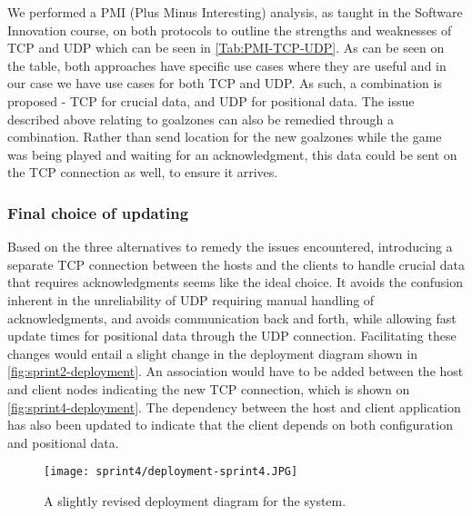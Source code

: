 We performed a PMI (Plus Minus Interesting) analysis, as taught in the Software Innovation course, on both protocols to outline the strengths and weaknesses of TCP and UDP which can be seen in \autoref{Tab:PMI-TCP-UDP}.
As can be seen on the table, both approaches have specific use cases where they are useful and in our case we have use cases for both TCP and UDP.
As such, a combination is proposed - TCP for crucial data, and UDP for positional data.
The issue described above relating to goalzones can also be remedied through a combination.
Rather than send location for the new goalzones while the game was being played and waiting for an acknowledgment, this data could be sent on the TCP connection as well, to ensure it arrives.

\subsubsection{Final choice of updating}
Based on the three alternatives to remedy the issues encountered, introducing a separate TCP connection between the hosts and the clients to handle crucial data that requires acknowledgments seems like the ideal choice.
It avoids the confusion inherent in the unreliability of UDP requiring manual handling of acknowledgments, and avoids communication back and forth, while allowing fast update times for positional data through the UDP connection.
Facilitating these changes would entail a slight change in the deployment diagram shown in \autoref{fig:sprint2-deployment}.
An association would have to be added between the host and client nodes indicating the new TCP connection, which is shown on \autoref{fig:sprint4-deployment}.
The dependency between the host and client application has also been updated to indicate that the client depends on both configuration and positional data.
\begin{figure}[H]
    \centering
    \texttt{[image: sprint4/deployment-sprint4.JPG]}
    \caption{A slightly revised deployment diagram for the system.}
    \label{fig:sprint4-deployment}
\end{figure}
\noindent

